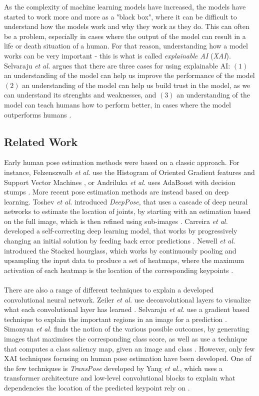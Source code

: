 \documentclass[./main.tex]{subfiles}
\begin{document}
As the complexity of machine learning models have increased, the models have started to work more and more as a "black box", where it can be difficult to understand how the models work and why they work as they do. This can often be a problem, especially in cases where the output of the model can result in a life or death situation of a human. For that reason, understanding how a model works can be very important - this is what is called \textit{explainable AI} (\textit{XAI}). Selvaraju \textit{et al.} \cite{Selvaraju} argues that there are three cases for using explainable AI: $(1)$ an understanding of the model can help us improve the performance of the model $(2)$ an understanding of the model can help us build trust in the model, as we can understand its strenghts and weaknesses, and $(3)$ an understanding of the model can teach humans how to perform better, in cases where the model outperforms humans \cite{Selvaraju}.

\subsection{Related Work}
Early human pose estimation methods were based on a classic approach. For instance, Felzenszwalb \textit{et al.} use the Histogram of Oriented Gradient features and Support Vector Machines \cite{Felzenszwalb}, or Andriluka \textit{et al.} uses AdaBoost with decision stumps \cite{Andriluka}. More recent pose estimation methods are instead based on deep learning. Toshev \textit{et al.} introduced \textit{DeepPose}, that uses a cascade of deep neural networks to estimate the location of joints, by starting with an estimation based on the full image, which is then refined using sub-images \cite{DeepPose}. Carreira \textit{et al.} developed a self-correcting deep learning model, that works by progressively changing an initial solution by feeding back error predictions \cite{Carreira}. Newell \textit{et al.} introduced the Stacked hourglass, which works by continuously pooling and upsampling the input data to produce a set of heatmaps, where the maximum activation of each heatmap is the location of the corresponding keypoints \cite{Newell}.
\\
\\
There are also a range of different techniques to explain a developed convolutional neural network. Zeiler \textit{et al.} use deconvolutional layers to visualize what each convolutional layer has learned \cite{Zeiler}. Selvaraju \textit{et al.} use a gradient based technique to explain the important regions in an image for a prediction \cite{Selvaraju}. Simonyan \textit{et al.} finds the notion of the various possible outcomes, by generating images that maximises the corresponding class score, as well as use a technique that computes a class saliency map, given an image and class \cite{Simonyan}. However, only few XAI techniques focusing on human pose estimation have been developed. One of the few techniques is \textit{TransPose} developed by Yang \textit{et al.}, which uses a transformer architecture and low-level convolutional blocks to explain what dependencies the location of the predicted keypoint rely on \cite{TransPose}.
\end{document}
